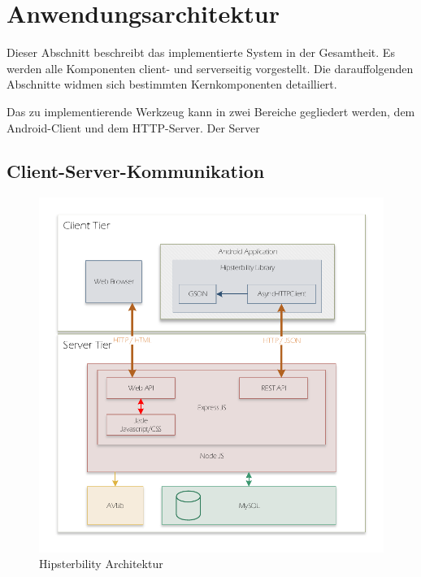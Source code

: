\section{Anwendungsarchitektur}
\label{app_architecture}
Dieser Abschnitt beschreibt das implementierte System in der Gesamtheit. Es werden alle Komponenten client- und serverseitig vorgestellt. Die darauffolgenden Abschnitte widmen sich bestimmten Kernkomponenten detailliert. 

Das zu implementierende Werkzeug kann in zwei Bereiche gegliedert werden, dem Android-Client und dem HTTP-Server. Der Server

\subsection{Client-Server-Kommunikation}

\begin{figure}[h]
	\label{fig:architecture}
	\includegraphics[width=\linewidth]{img/architecture}
	\caption{Hipsterbility Architektur}
\end{figure}

